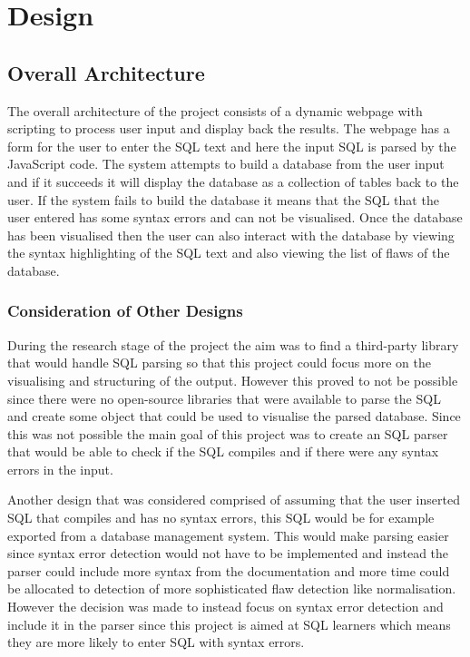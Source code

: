 \chapter{Design}

\section{Overall Architecture}

The overall architecture of the project consists of a dynamic webpage with scripting to process user input and display back the results. The webpage has a form for the user to enter the SQL text and here the input SQL is parsed by the JavaScript code. The system attempts to build a database from the user input and if it succeeds it will display the database as a collection of tables back to the user. If the system fails to build the database it means that the SQL that the user entered has some syntax errors and can not be visualised. Once the database has been visualised then the user can also interact with the database by viewing the syntax highlighting of the SQL text and also viewing the list of flaws of the database.

\subsection{Consideration of Other Designs}

During the research stage of the project the aim was to find a third-party library that would handle SQL parsing so that this project could focus more on the visualising and structuring of the output. However this proved to not be possible since there were no open-source libraries that were available to parse the SQL and create some object that could be used to visualise the parsed database. Since this was not possible the main goal of this project was to create an SQL parser that would be able to check if the SQL compiles and if there were any syntax errors in the input.

Another design that was considered comprised of assuming that the user inserted SQL that compiles and has no syntax errors, this SQL would be for example exported from a database management system. This would make parsing easier since syntax error detection would not have to be implemented and instead the parser could include more syntax from the documentation and more time could be allocated to detection of more sophisticated flaw detection like normalisation. However the decision was made to instead focus on syntax error detection and include it in the parser since this project is aimed at SQL learners which means they are more likely to enter SQL with syntax errors.

